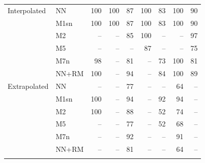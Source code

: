 \documentclass[pdflatex,sn-basic]{sn-jnl}
\begin{document}
\begin{table}[p]
\begin{tabular}{@{}llrrrrrrr@{}}
Interpolated & NN & 100 & 100 & 87 & 100 & 83 & 100 & 90 \\
 & M1sn & 100 & 100 & 87 & 100 & 83 & 100 & 90 \\
 & M2 & -- & -- & 85 & 100 & -- & -- & 97 \\
 & M5 & -- & -- & -- & 87 & -- & -- & 75 \\
 & M7n & 98 & -- & 81 & -- & 73 & 100 & 81 \\
 & NN+RM & 100 & -- & 94 & -- & 84 & 100 & 89 \\
Extrapolated & NN & -- & -- & 77 & -- & -- & 64 & -- \\
 & M1sn & 100 & -- & 94 & -- & 92 & 94 & -- \\
 & M2 & 100 & -- & 88 & -- & 52 & 74 & -- \\
 & M5 & -- & -- & 77 & -- & 52 & 68 & -- \\
 & M7n & -- & -- & 92 & -- & -- & 91 & -- \\
 & NN+RM & -- & -- & 81 & -- & -- & 64 & -- \\
\botrule
\end{tabular}
\end{table}
\end{document}
